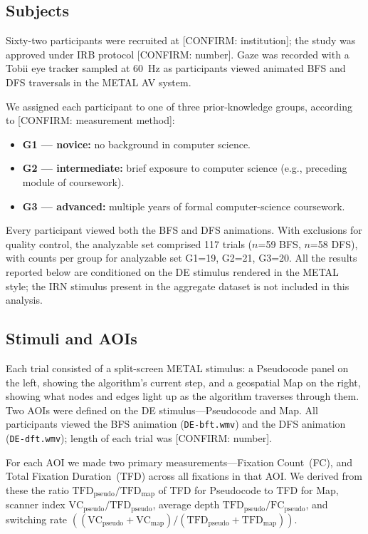 \documentclass[journal]{vgtc}
\begin{document}
\subsection{Subjects}
\label{sec:subjects}

Sixty-two participants were recruited at [CONFIRM: institution]; the
study was approved under IRB protocol [CONFIRM: number]. Gaze was
recorded with a Tobii eye tracker sampled at 60~Hz as participants
viewed animated BFS and DFS traversals in the METAL AV system.

We assigned each participant to one of three prior-knowledge groups,
according to [CONFIRM: measurement method]:
\begin{itemize}
  \item \textbf{G1 --- novice:} no background in computer science.
  \item \textbf{G2 --- intermediate:} brief exposure to computer
    science (e.g., preceding module of coursework).
  \item \textbf{G3 --- advanced:} multiple years of formal
    computer-science coursework.
\end{itemize}

Every participant viewed both the BFS and DFS animations. With
exclusions for quality control, the analyzable set comprised 117
trials ($n$=59 BFS, $n$=58 DFS), with counts per group for analyzable
set G1=19, G2=21, G3=20. All the results reported below are
conditioned on the DE stimulus rendered in the METAL style; the IRN
stimulus present in the aggregate dataset is not included in this
analysis.

\subsection{Stimuli and AOIs}
\label{sec:stimuli}

Each trial consisted of a split-screen METAL stimulus: a Pseudocode
panel on the left, showing the algorithm's current step, and a
geospatial Map on the right, showing what nodes and edges light up as
the algorithm traverses through them. Two AOIs were defined on the DE
stimulus---Pseudocode and Map. All participants viewed the BFS
animation (\texttt{DE-bft.wmv}) and the DFS animation
(\texttt{DE-dft.wmv}); length of each trial was [CONFIRM: number].

For each AOI we made two primary measurements---Fixation Count~(FC),
and Total Fixation Duration~(TFD) across all fixations in that AOI.
We derived from these the ratio
$\text{TFD}_\text{pseudo}/\text{TFD}_\text{map}$ of TFD for Pseudocode
to TFD for Map, scanner index
$\text{VC}_\text{pseudo}/\text{TFD}_\text{pseudo}$, average depth
$\text{TFD}_\text{pseudo}/\text{FC}_\text{pseudo}$, and switching
rate
$((\text{VC}_\text{pseudo}+\text{VC}_\text{map})/
(\text{TFD}_\text{pseudo}+\text{TFD}_\text{map}))$.
\end{document}
